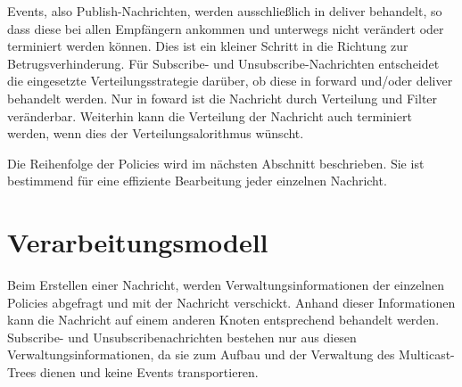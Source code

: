 \begin{table}[!h]
\caption{Verbindungsmatrix}
\label{tab:verbindungsmatrix}
\end{table}

Events, also Publish-Nachrichten, werden ausschließlich in deliver behandelt, so dass diese bei allen Empfängern ankommen und unterwegs nicht verändert oder terminiert werden können. Dies ist ein kleiner Schritt in die Richtung zur Betrugsverhinderung. Für Subscribe- und Unsubscribe-Nachrichten entscheidet die eingesetzte Verteilungsstrategie darüber, ob diese in forward und/oder deliver behandelt werden. Nur in foward ist die Nachricht durch Verteilung und Filter veränderbar. Weiterhin kann die Verteilung der Nachricht auch terminiert werden, wenn dies der Verteilungsalorithmus wünscht.

Die Reihenfolge der Policies wird im nächsten Abschnitt beschrieben. Sie ist bestimmend für eine effiziente Bearbeitung jeder einzelnen Nachricht.

\section{Verarbeitungsmodell}
Beim Erstellen einer Nachricht, werden Verwaltungsinformationen der einzelnen Policies abgefragt und mit der Nachricht verschickt. Anhand dieser Informationen kann die Nachricht auf einem anderen Knoten entsprechend behandelt werden. Subscribe- und Unsubscribenachrichten bestehen nur aus diesen Verwaltungsinformationen, da sie zum Aufbau und der Verwaltung des Multicast-Trees dienen und keine Events transportieren.

